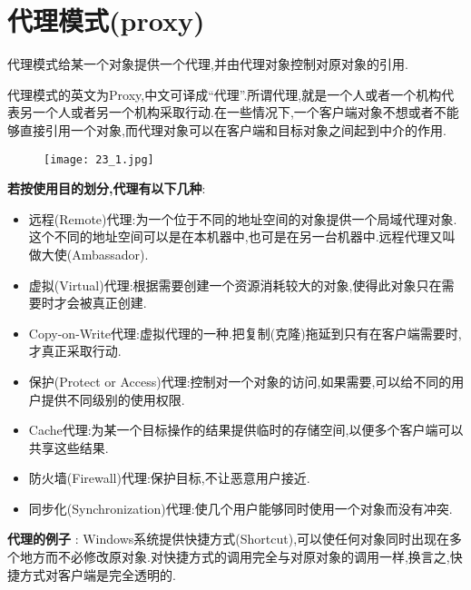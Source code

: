 \documentclass[../main.tex]{subfiles}
\begin{document}
\section{代理模式(proxy)}
\noindent 代理模式给某一个对象提供一个代理,并由代理对象控制对原对象的引用.

代理模式的英文为Proxy,中文可译成“代理”.所谓代理,就是一个人或者一个机构代表另一个人或者另一个机构采取行动.在一些情况下,一个客户端对象不想或者不能够直接引用一个对象,而代理对象可以在客户端和目标对象之间起到中介的作用.
%
\begin{figure}[H]
  \texttt{[image: 23\_1.jpg]}
\end{figure}
%
\textbf{若按使用目的划分,代理有以下几种}:
\begin{itemize}
  \item 远程(Remote)代理:为一个位于不同的地址空间的对象提供一个局域代理对象.这个不同的地址空间可以是在本机器中,也可是在另一台机器中.远程代理又叫做大使(Ambassador).
  \item 虚拟(Virtual)代理:根据需要创建一个资源消耗较大的对象,使得此对象只在需要时才会被真正创建.
  \item Copy-on-Write代理:虚拟代理的一种.把复制(克隆)拖延到只有在客户端需要时,才真正采取行动.
  \item 保护(Protect or Access)代理:控制对一个对象的访问,如果需要,可以给不同的用户提供不同级别的使用权限.
  \item Cache代理:为某一个目标操作的结果提供临时的存储空间,以便多个客户端可以共享这些结果.
  \item 防火墙(Firewall)代理:保护目标,不让恶意用户接近.
  \item 同步化(Synchronization)代理:使几个用户能够同时使用一个对象而没有冲突.
\end{itemize}
%
\textbf{代理的例子} :
Windows系统提供快捷方式(Shortcut),可以使任何对象同时出现在多个地方而不必修改原对象.对快捷方式的调用完全与对原对象的调用一样,换言之,快捷方式对客户端是完全透明的.
%
\end{document}
